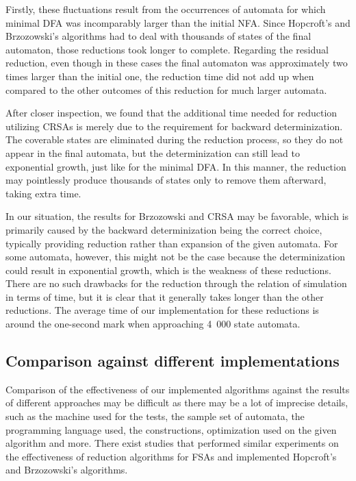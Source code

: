 Firstly, these fluctuations result from the occurrences of automata for which minimal DFA was incomparably larger than the initial NFA. Since Hopcroft's and Brzozowski's algorithms had to deal with thousands of states of the final automaton, those reductions took longer to complete. Regarding the residual reduction, even though in these cases the final automaton was approximately two times larger than the initial one, the reduction time did not add up when compared to the other outcomes of this reduction for much larger automata.

After closer inspection, we found that the additional time needed for reduction utilizing CRSAs is merely due to the requirement for backward determinization. The coverable states are eliminated during the reduction process, so they do not appear in the final automata, but the determinization can still lead to exponential growth, just like for the minimal DFA. In this manner, the reduction may pointlessly produce thousands of states only to remove them afterward, taking extra time.

In our situation, the results for Brzozowski and CRSA may be favorable, which is primarily caused by the backward determinization being the correct choice, typically providing reduction rather than expansion of the given automata. For some automata, however, this might not be the case because the determinization could result in exponential growth, which is the weakness of these reductions. There are no such drawbacks for the reduction through the relation of simulation in terms of time, but it is clear that it generally takes longer than the other reductions. The average time of our implementation for these reductions is around the one-second mark when approaching 4\ 000 state automata.

\subsection{Comparison against different implementations}

Comparison of the effectiveness of our implemented algorithms against the results of different approaches may be difficult as there may be a lot of imprecise details, such as the machine used for the tests, the sample set of automata, the programming language used, the constructions, optimization used on the given algorithm and more. There exist studies that performed similar experiments on the effectiveness of reduction algorithms for FSAs and implemented Hopcroft's and Brzozowski's algorithms. 

